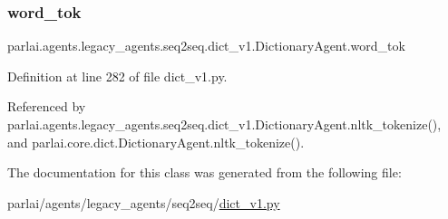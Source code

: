 \mbox{\label{classparlai_1_1agents_1_1legacy__agents_1_1seq2seq_1_1dict__v1_1_1DictionaryAgent_a939766de810c2b878150ca86d36025f2}} 
\subsubsection{\texorpdfstring{word\+\_\+tok}{word\_tok}}
{\footnotesize\ttfamily parlai.\+agents.\+legacy\+\_\+agents.\+seq2seq.\+dict\+\_\+v1.\+Dictionary\+Agent.\+word\+\_\+tok}



Definition at line 282 of file dict\+\_\+v1.\+py.



Referenced by parlai.\+agents.\+legacy\+\_\+agents.\+seq2seq.\+dict\+\_\+v1.\+Dictionary\+Agent.\+nltk\+\_\+tokenize(), and parlai.\+core.\+dict.\+Dictionary\+Agent.\+nltk\+\_\+tokenize().



The documentation for this class was generated from the following file\+:\begin{DoxyCompactItemize}
\item 
parlai/agents/legacy\+\_\+agents/seq2seq/\hyperlink{dict__v1_8py}{dict\+\_\+v1.\+py}\end{DoxyCompactItemize}
